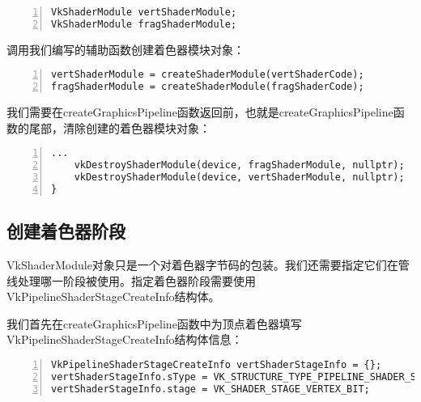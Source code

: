 \documentclass{ctexart}
\begin{document}
\begin{lstlisting}[language={[ANSI]C},keywordstyle=\color{blue!70},commentstyle=\color{red!50!green!50!blue!50},frame=shadowbox, rulesepcolor=\color{red!20!green!20!blue!20},basicstyle=\small,numbers=left, numberstyle=\tiny,breaklines=true]
VkShaderModule vertShaderModule;
VkShaderModule fragShaderModule;
\end{lstlisting}

调用我们编写的辅助函数创建着色器模块对象：

\begin{lstlisting}[language={[ANSI]C},keywordstyle=\color{blue!70},commentstyle=\color{red!50!green!50!blue!50},frame=shadowbox, rulesepcolor=\color{red!20!green!20!blue!20},basicstyle=\small,numbers=left, numberstyle=\tiny,breaklines=true]
vertShaderModule = createShaderModule(vertShaderCode);
fragShaderModule = createShaderModule(fragShaderCode);
\end{lstlisting}

我们需要在createGraphicsPipeline函数返回前，也就是createGraphicsPipeline函数的尾部，清除创建的着色器模块对象：

\begin{lstlisting}[language={[ANSI]C},keywordstyle=\color{blue!70},commentstyle=\color{red!50!green!50!blue!50},frame=shadowbox, rulesepcolor=\color{red!20!green!20!blue!20},basicstyle=\small,numbers=left, numberstyle=\tiny,breaklines=true]
		...
	vkDestroyShaderModule(device, fragShaderModule, nullptr);
	vkDestroyShaderModule(device, vertShaderModule, nullptr);
}
\end{lstlisting}

\subsection{创建着色器阶段}

VkShaderModule对象只是一个对着色器字节码的包装。我们还需要指定它们在管线处理哪一阶段被使用。指定着色器阶段需要使用VkPipelineShaderStageCreateInfo结构体。

我们首先在createGraphicsPipeline函数中为顶点着色器填写VkPipelineShaderStageCreateInfo结构体信息：

\begin{lstlisting}[language={[ANSI]C},keywordstyle=\color{blue!70},commentstyle=\color{red!50!green!50!blue!50},frame=shadowbox, rulesepcolor=\color{red!20!green!20!blue!20},basicstyle=\small,numbers=left, numberstyle=\tiny,breaklines=true]
VkPipelineShaderStageCreateInfo vertShaderStageInfo = {};
vertShaderStageInfo.sType = VK_STRUCTURE_TYPE_PIPELINE_SHADER_STAGE_CREATE_INFO;
vertShaderStageInfo.stage = VK_SHADER_STAGE_VERTEX_BIT;
\end{lstlisting}
\end{document}

